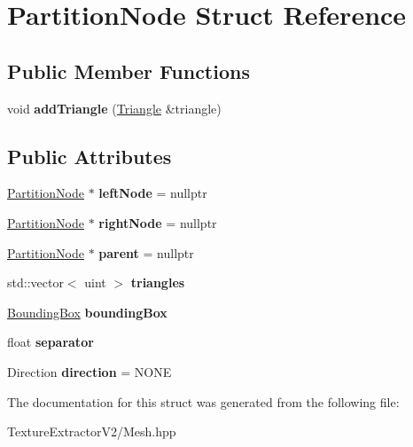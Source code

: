 \hypertarget{struct_partition_node}{}\section{Partition\+Node Struct Reference}
\label{struct_partition_node}
\subsection*{Public Member Functions}
\begin{DoxyCompactItemize}
\item 
\hypertarget{struct_partition_node_aaababc44867907150c7371d071e7ec8d}{}void {\bfseries add\+Triangle} (\hyperlink{struct_triangle}{Triangle} \&triangle)\label{struct_partition_node_aaababc44867907150c7371d071e7ec8d}

\end{DoxyCompactItemize}
\subsection*{Public Attributes}
\begin{DoxyCompactItemize}
\item 
\hypertarget{struct_partition_node_a82bfd35cfcfc913ab41b2cb8c3c2f499}{}\hyperlink{struct_partition_node}{Partition\+Node} $\ast$ {\bfseries left\+Node} = nullptr\label{struct_partition_node_a82bfd35cfcfc913ab41b2cb8c3c2f499}

\item 
\hypertarget{struct_partition_node_a673d8267a9eb0a5c77bdfc48b00f1e16}{}\hyperlink{struct_partition_node}{Partition\+Node} $\ast$ {\bfseries right\+Node} = nullptr\label{struct_partition_node_a673d8267a9eb0a5c77bdfc48b00f1e16}

\item 
\hypertarget{struct_partition_node_a4d66482e5a4c91717fd0d935557ceb14}{}\hyperlink{struct_partition_node}{Partition\+Node} $\ast$ {\bfseries parent} = nullptr\label{struct_partition_node_a4d66482e5a4c91717fd0d935557ceb14}

\item 
\hypertarget{struct_partition_node_a45bf7beca48bcb4533d7f7d21e0df440}{}std\+::vector$<$ uint $>$ {\bfseries triangles}\label{struct_partition_node_a45bf7beca48bcb4533d7f7d21e0df440}

\item 
\hypertarget{struct_partition_node_a7f1efc38b6bbdf4cc2f8e36574bbf276}{}\hyperlink{struct_bounding_box}{Bounding\+Box} {\bfseries bounding\+Box}\label{struct_partition_node_a7f1efc38b6bbdf4cc2f8e36574bbf276}

\item 
\hypertarget{struct_partition_node_aa1c74a380fa906533ad5e7649293e711}{}float {\bfseries separator}\label{struct_partition_node_aa1c74a380fa906533ad5e7649293e711}

\item 
\hypertarget{struct_partition_node_a5e861a43672acf654394a15b012df231}{}Direction {\bfseries direction} = N\+O\+N\+E\label{struct_partition_node_a5e861a43672acf654394a15b012df231}

\end{DoxyCompactItemize}


The documentation for this struct was generated from the following file\+:\begin{DoxyCompactItemize}
\item 
Texture\+Extractor\+V2/Mesh.\+hpp\end{DoxyCompactItemize}

